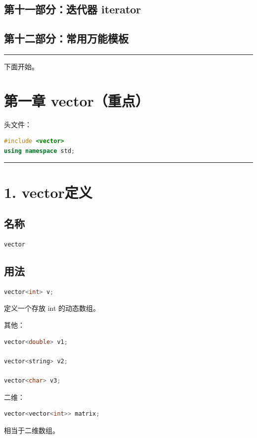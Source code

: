 \documentclass[9pt,twocolumn]{extarticle}
\begin{document}
\subsection*{第十一部分：迭代器 iterator}
\subsection*{第十二部分：常用万能模板}

\noindent\rule{\linewidth}{0.4pt}

下面开始。

\section{第一章 vector（重点）}

头文件：

\begin{lstlisting}[language=C++]
#include <vector>
using namespace std;
\end{lstlisting}

\noindent\rule{\linewidth}{0.4pt}

\section{1. vector定义}

\subsection{名称}
\begin{lstlisting}[language=C++]
vector
\end{lstlisting}

\subsection{用法}
\begin{lstlisting}[language=C++]
vector<int> v;
\end{lstlisting}
定义一个存放 int 的动态数组。

其他：
\begin{lstlisting}[language=C++]
vector<double> v1;

vector<string> v2;

vector<char> v3;
\end{lstlisting}

二维：
\begin{lstlisting}[language=C++]
vector<vector<int>> matrix;
\end{lstlisting}
相当于二维数组。
\end{document}
